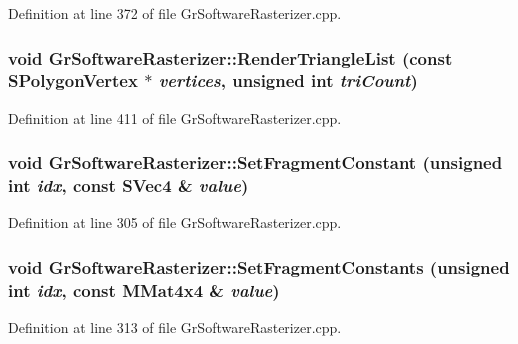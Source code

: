 \begin{CompactItemize}
Definition at line 372 of file GrSoftwareRasterizer.cpp.\hypertarget{class_gr_software_rasterizer_88d35958cb87737f1d82a14ef513b10a}{
\subsubsection[{RenderTriangleList}]{\setlength{\rightskip}{0pt plus 5cm}void GrSoftwareRasterizer::RenderTriangleList (const {\bf SPolygonVertex} $\ast$ {\em vertices}, \/  unsigned int {\em triCount})}}
\label{class_gr_software_rasterizer_88d35958cb87737f1d82a14ef513b10a}




Definition at line 411 of file GrSoftwareRasterizer.cpp.\hypertarget{class_gr_software_rasterizer_cddd37af11129fa007df31f439e683cc}{
\subsubsection[{SetFragmentConstant}]{\setlength{\rightskip}{0pt plus 5cm}void GrSoftwareRasterizer::SetFragmentConstant (unsigned int {\em idx}, \/  const {\bf SVec4} \& {\em value})}}
\label{class_gr_software_rasterizer_cddd37af11129fa007df31f439e683cc}




Definition at line 305 of file GrSoftwareRasterizer.cpp.\hypertarget{class_gr_software_rasterizer_1ed18c92ae0225a77954ec6371b74401}{
\subsubsection[{SetFragmentConstants}]{\setlength{\rightskip}{0pt plus 5cm}void GrSoftwareRasterizer::SetFragmentConstants (unsigned int {\em idx}, \/  const {\bf MMat4x4} \& {\em value})}}
\label{class_gr_software_rasterizer_1ed18c92ae0225a77954ec6371b74401}




Definition at line 313 of file GrSoftwareRasterizer.cpp.\hypertarget{class_gr_software_rasterizer_660384a042b72d1f2e1235a938acc23b}{
}
\end{CompactItemize}
